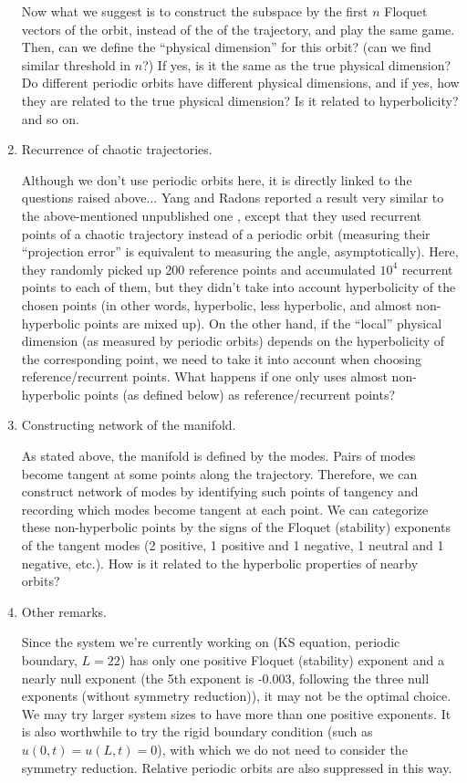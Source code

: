 \begin{enumerate}
  Now what we suggest is to construct the subspace
  by the first $n$ Floquet vectors of the orbit,
  instead of the {\cLvs} of the trajectory,
  and play the same game.
  Then, can we define the ``physical dimension'' for this orbit?
  (can we find similar threshold in $n$?)
  If yes, is it the same as the true physical dimension?
  Do different periodic orbits have different physical dimensions,
  and if yes, how they are related to the true physical dimension?
  Is it related to hyperbolicity? and so on.

\item Recurrence of chaotic trajectories.

  Although we don't use periodic orbits here, it is directly linked
  to the questions raised above...
  Yang and Radons \cite{YaRa11} reported a result very similar
  to the above-mentioned unpublished one \cite{TaCh11},
  except that they used recurrent points of a chaotic trajectory
  instead of a periodic orbit (measuring their ``projection error''
  is equivalent to measuring the angle, asymptotically).
  Here, they randomly picked up 200 reference points
  and accumulated $10^4$ recurrent points to each of them,
  but they didn't take into account hyperbolicity of the chosen points
  (in other words, hyperbolic, less hyperbolic, and almost non-hyperbolic points
  are mixed up).
  On the other hand, if the ``local'' physical dimension
  (as measured by periodic orbits) depends
  on the hyperbolicity of the corresponding point,
  we need to take it into account when choosing reference/recurrent points.
  What happens if one only uses almost non-hyperbolic points (as defined below)
  as reference/recurrent points?

\item Constructing network of the {\entangled} manifold.

  As stated above, the {\entangled} manifold is defined by the {\entangled} modes.
  Pairs of {\entangled} modes become tangent at some points along the trajectory.
  Therefore, we can construct network of {\entangled} modes
  by identifying such points of tangency
  and recording which {\entangled} modes become tangent at each point.
  We can categorize these non-hyperbolic points
  by the signs of the Floquet (stability) exponents of the tangent modes
  (2 positive, 1 positive and 1 negative, 1 neutral and 1 negative, etc.).
  How is it related to the hyperbolic properties of nearby orbits?

\item Other remarks.

  Since the system we're currently working on
  (KS equation, periodic boundary, $L=22$)
  has only one positive Floquet (stability) exponent and a nearly null exponent
  (the 5th exponent is -0.003, following the three null exponents
  (without symmetry reduction)), it may not be the optimal choice.
  We may try larger system sizes to have more than one positive exponents.
  It is also worthwhile to try the rigid boundary condition
  (such as $u(0,t) = u(L,t) = 0$), with which we do not need to consider
  the symmetry reduction.
  Relative periodic orbits are also suppressed in this way.

\end{enumerate}

